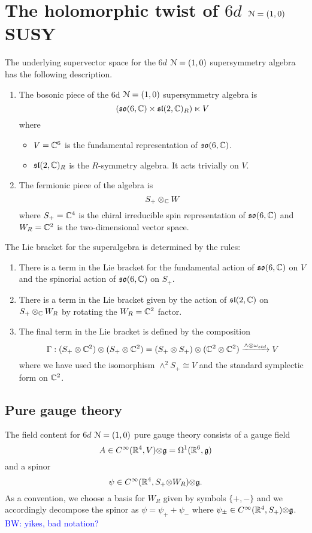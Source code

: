 \documentclass[10pt, oneside]{article}
\title{6d $\cN = (1,0)}
\author{Brian}
\date{\today}
\def\brian{\textcolor{blue}{BW: }\textcolor{blue}}
\def\tensor{{\otimes}}
\begin{document}
\section{The holomorphic twist of $6d$ $\mc N = (1,0)$ SUSY}

The underlying supervector space for the $6d$ $\mathcal{N} = (1,0)$ supersymmetry algebra has the following description. 
\begin{enumerate}
\item The bosonic piece of the 6d $\mathcal{N} = (1,0)$ supersymmetry algebra is
\[
(\mathfrak{so} (6, \mathbb{C}) \times \mathfrak{sl}(2, \mathbb{C})_R) \ltimes V
\]
where 
\begin{itemize}
\item $V = \mathbb{C}^6$ is the fundamental representation of $\mathfrak{so}(6,\mathbb{C})$.
\item $\mathfrak{sl}(2, \mathbb{C})_R$ is the $R$-symmetry algebra.
It acts trivially on $V$. 
\end{itemize}
\item The fermionic piece of the algebra is 
\[
S_+ \otimes_{\mathbb{C}} W
\]
where $S_+ = \mathbb{C}^4$ is the chiral irreducible spin representation of $\mathfrak{so}(6, \mathbb{C})$ and $W_R = \mathbb{C}^2$ is the two-dimensional vector space. 
\end{enumerate}

The Lie bracket for the superalgebra is determined by the rules:
\begin{enumerate}
\item
There is a term in the Lie bracket for the fundamental action of $\mathfrak{so}(6, \mathbb{C})$ on $V$ and the spinorial action of $\mathfrak{so}(6,\mathbb{C})$ on $S_+$. 
\item 
There is a term in the Lie bracket given by the action of $\mathfrak{sl} (2,\mathbb{C})$ on $S_+ \otimes_{\mathbb{C}} W_R$ by rotating the $W_R = \mathbb{C}^2$ factor. 
\item
The final term in the Lie bracket is defined by the composition
\[
\Gamma : (S_+ \otimes \mathbb{C}^2) \otimes (S_+ \otimes \mathbb{C}^2) = (S_+ \otimes S_+) \otimes (\mathbb{C}^2 \otimes \mathbb{C}^2) \xrightarrow{\wedge \otimes \omega_{std}} V 
\]
where we have used the isomorphism $\wedge^2 S_+ \cong V$ and the standard symplectic form on $\mathbb{C}^2$. 
\end{enumerate}

\subsection{Pure gauge theory}

The field content for $6d$ $\mathcal{N} = (1,0)$ pure gauge theory consists of a gauge field
\[
A \in C^\infty(\RR^4, V) \tensor \mf g = \Omega^1(\RR^6, \mf g)
\]
and a spinor
\[
\psi \in C^\infty(\RR^4, S_+ \tensor W_R) \tensor \mf g .
\]
As a convention, we choose a basis for $W_R$ given by symbols $\{+, -\}$ and we accordingly decompose the spinor as $\psi = \psi_+ + \psi_-$ where $\psi_{\pm} \in C^\infty(\RR^4, S_+) \tensor \mf g$.
\brian{yikes, bad notation?}
\end{document}
